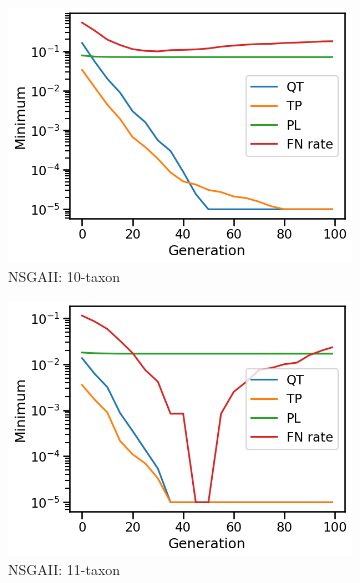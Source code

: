 \begin{figure}[!h]
	\centering
\begin{subfigure}[b]{0.33\textwidth}
			\includegraphics[width=\textwidth]{Figure/10-taxon_NSGAII_minimum}
			\caption{NSGAII: 10-taxon}
\end{subfigure}\begin{subfigure}[b]{0.33\textwidth}
			\includegraphics[width=\textwidth]{Figure/11-taxon_NSGAII_minimum}
			\caption{NSGAII: 11-taxon}
\end{subfigure}\begin{subfigure}[b]{0.33\textwidth}

\end{subfigure}
\end{figure}

